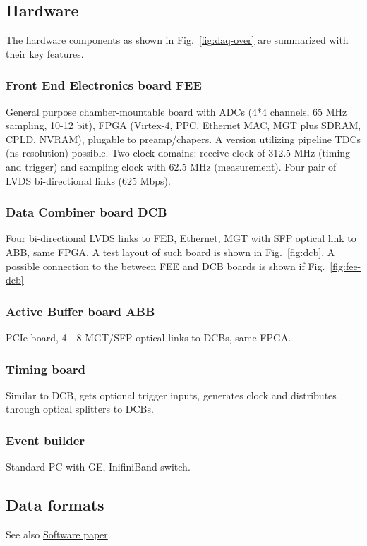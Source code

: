 \subsection{Hardware}
The hardware components as shown in Fig.~\ref{fig:daq-over} are
summarized with their key features.
\subsubsection{Front End Electronics board FEE}
General purpose chamber-mountable board with ADCs (4*4 channels,
65 MHz sampling, 10-12 bit), FPGA (Virtex-4, PPC, Ethernet MAC,
MGT plus SDRAM, CPLD, NVRAM), plugable to preamp/chapers. A
version utilizing pipeline TDCs (ns resolution) possible. Two
clock domains: receive clock of 312.5 MHz (timing and trigger) and
sampling clock with 62.5 MHz (measurement). Four pair of LVDS
bi-directional links (625 Mbps).
\subsubsection{Data Combiner board DCB}
Four bi-directional LVDS links to FEB, Ethernet, MGT with SFP
optical link to ABB, same FPGA. A test layout of such board is shown in Fig.~\ref{fig:dcb}.
A possible connection to the between FEE and DCB boards is shown if Fig.~\ref{fig:fee-dcb}
\subsubsection{Active Buffer board ABB}
PCIe board, 4 - 8 MGT/SFP optical links to DCBs, same FPGA.
\subsubsection{Timing board}
Similar to DCB, gets optional trigger inputs, generates clock and distributes through
optical splitters to DCBs.
\subsubsection{Event builder}
Standard PC with GE, InifiniBand switch.


\subsection{Data formats}
See also \hyperref{http://www-linux.gsi.de/~mbs/main-software.pdf}{sw}{data}{Software paper}.
